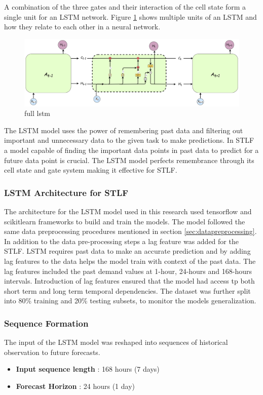  A combination of the three gates and their interaction of the cell state form a single unit for an LSTM network. Figure \ref{fig:full-lstm} shows multiple units of an LSTM and how they relate to each other in a neural network. 
 \begin{figure}[h]
 	\centering
 	\includegraphics[width=0.9\linewidth]{"Chapters/images/full lstm"}
 	\caption{full lstm}
 	\label{fig:full-lstm}
 \end{figure}
 The LSTM model uses the power of remembering past data and filtering out important and unnecessary data to the given task to make predictions. In STLF a model capable of finding the important data points in past data to predict for a future data point is crucial. The LSTM model perfects remembrance through its cell state and gate system making it effective for STLF.
 
 \subsubsection{LSTM Architecture for STLF}
 
 The architecture for the LSTM model used in this research used tensorflow and scikitlearn frameworks to build and train the models. The model followed the same data preprocessing procedures mentioned in section \ref{sec:datapreprocessing}. In addition to the data pre-processing steps a lag feature was added for the STLF. LSTM requires past data to make an accurate prediction and by adding lag features to the data helps the model train with context of the past data. The lag features included the past demand values at 1-hour, 24-hours and 168-hours intervals. Introduction of lag features ensured that the model had access tp both short term and long term temporal dependencies. The dataset was further split into 80\% training and 20\% testing subsets, to monitor the models generalization.
 
 \subsubsection{Sequence Formation}
 The input of the LSTM model was reshaped into sequences of historical observation to future forecasts.
 \begin{itemize}
 	\item \textbf{Input sequence length} : 168 hours (7 days)
 	\item \textbf{Forecast Horizon} : 24 hours (1 day)
 \end{itemize}
 
